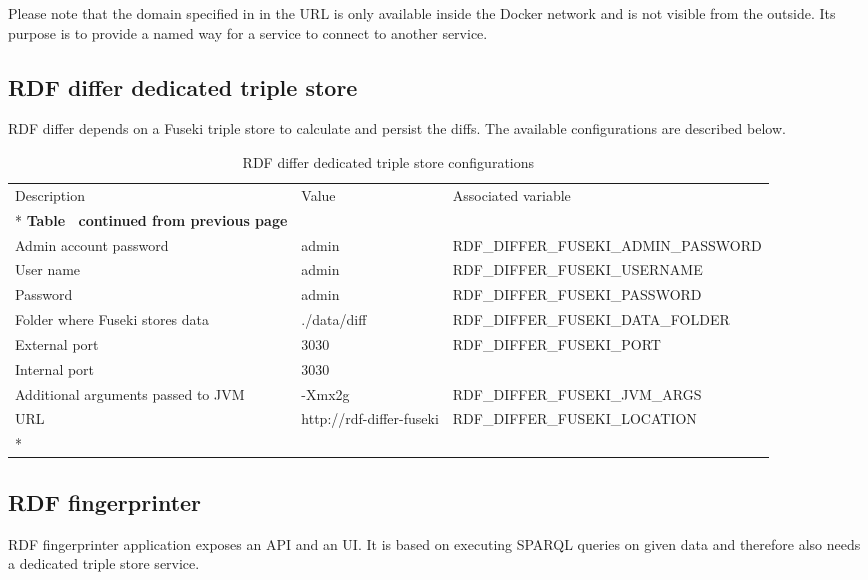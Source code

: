 	Please note that the domain specified in in the URL is only available inside the Docker network and is not visible from the outside. Its purpose is to provide a named way for a service to connect to another service. 
	
	\subsection{RDF differ dedicated triple store}
	
	RDF differ depends on a Fuseki triple store to calculate and persist the diffs. The available configurations are described below. 

	\begin{longtable}[c]{@{}p{4cm}p{2cm}l@{}}
		\toprule
		Description & Value & Associated variable \\* \midrule
		\endfirsthead
		\multicolumn{3}{c}%
		{{\bfseries Table \thetable\ continued from previous page}} \\
		\endhead
		\bottomrule
		\endfoot
		\endlastfoot
		Admin account password & admin & RDF\_DIFFER\_FUSEKI\_ADMIN\_PASSWORD \\
		User name & admin & RDF\_DIFFER\_FUSEKI\_USERNAME \\
		Password & admin & RDF\_DIFFER\_FUSEKI\_PASSWORD \\
		Folder where Fuseki stores data & ./data/diff & RDF\_DIFFER\_FUSEKI\_DATA\_FOLDER \\
		External port & 3030 & RDF\_DIFFER\_FUSEKI\_PORT \\
		Internal port & 3030 &  \\
		Additional arguments passed to JVM & -Xmx2g & RDF\_DIFFER\_FUSEKI\_JVM\_ARGS \\
		URL & http://rdf-differ-fuseki & RDF\_DIFFER\_FUSEKI\_LOCATION \\* \bottomrule
		\caption{RDF differ dedicated triple store configurations}
		\label{tab:my-table2}\\
	\end{longtable}
	
	\subsection{RDF fingerprinter}
	
	RDF fingerprinter application exposes an API and an UI. It is based on executing SPARQL queries on given data and therefore also needs a dedicated triple store service. 

